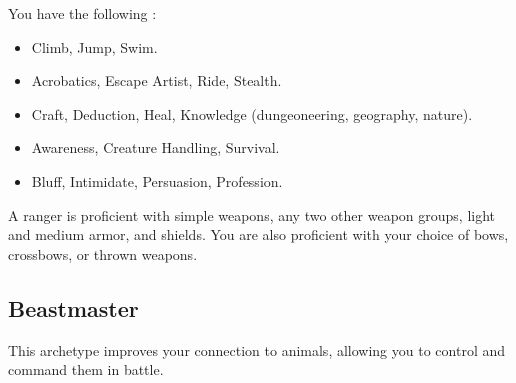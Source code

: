         You have the following :
        \begin{itemize}
            \item {} Climb, Jump, Swim.
            \item {} Acrobatics, Escape Artist, Ride, Stealth.
            \item {} Craft, Deduction, Heal, Knowledge (dungeoneering, geography, nature).
            \item {} Awareness, Creature Handling, Survival.
            \item {} Bluff, Intimidate, Persuasion, Profession.
        \end{itemize}

        A ranger is proficient with simple weapons, any two other weapon groups, light and medium armor, and shields.
        You are also proficient with your choice of bows, crossbows, or thrown weapons.

    \subsection{Beastmaster}
        This archetype improves your connection to animals, allowing you to control and command them in battle.

